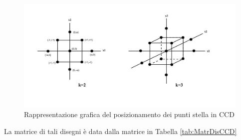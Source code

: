 \documentclass[
  11pt,
]{book}
\begin{document}
\begin{figure}[ht]

{\centering \includegraphics[width=1\linewidth]{Immagini/CCD/01_Rappresentazione} 

}

\caption{Rappresentazione grafica del posizionamento dei punti stella in CCD}\label{fig:ccd1}
\end{figure}

La matrice di tali disegni è data dalla matrice in Tabella \ref{tab:MatrDisCCD}
\end{document}
